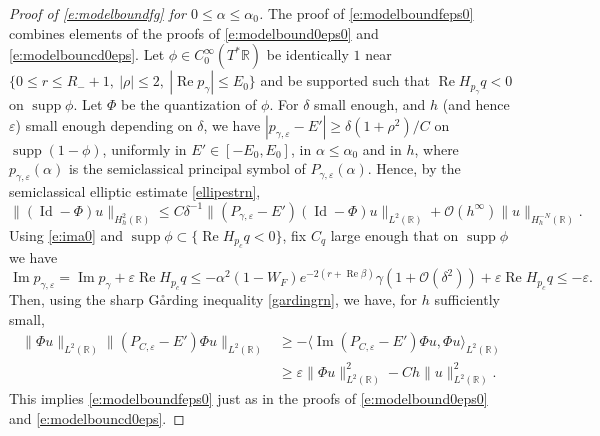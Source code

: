 \documentclass[reqno, 12pt]{amsart}
\newcommand \R {\mathbb{R}}
\newcommand \Oh {\mathcal{O}}
\newcommand \la {\langle}
\newcommand \ra {\rangle}
\newcommand \eps {\varepsilon}
\DeclareMathOperator \re {Re}
\DeclareMathOperator \im {Im}
\DeclareMathOperator \supp {supp}
\DeclareMathOperator \Id {Id}
\theoremstyle{definition}
\numberwithin{equation}{section}
\numberwithin{prop}{section}
\numberwithin{figure}{section}
\begin{document}
\begin{proof}[Proof of \eqref{e:modelboundfg} for $0 \le \alpha \le \alpha_0$]
The proof of \eqref{e:modelboundfeps0} combines  elements of the proofs of \eqref{e:modelbound0eps0} and \eqref{e:modelbouncd0eps}. Let $\phi \in C_0^\infty(T^*\R)$ be identically $1$ near $\{0 \le r \le R_- + 1,\ | \rho|\le2,\ |\re p_\gamma| \le E_0\}$ and be supported such that $\re H_{p_\gamma}q <0$ on $\supp \phi$. Let $\Phi$ be the quantization of $\phi$. For $\delta$ small enough, and $h$ (and hence $\eps$) small enough depending on $\delta$,  we have $|p_{\gamma,\eps} - E'| \ge \delta (1 +  \rho^2)/C$ on $\supp (1-\phi)$, uniformly in $E' \in [-E_0,E_0]$, in $\alpha \le \alpha_0$ and in $h$, where $p_{\gamma,\eps}(\alpha)$ is the semiclassical principal symbol of $P_{\gamma,\eps}(\alpha)$. Hence, by the semiclassical elliptic estimate \eqref{ellipestrn},
\[
\|(\Id - \Phi) u\|_{H^2_{h}(\R)} \le C \delta^{-1}\|(P_{\gamma,\eps} - E')(\Id - \Phi) u\|_{L^2(\R)} + \Oh(h^\infty)\|u\|_{H^{-N}_{ h}(\R)}.
\]
Using \eqref{e:ima0} and $\supp\phi \subset \{\re H_{p_c}q <0\}$, fix $C_q$ large enough that on $\supp\phi$  we have
\[
\im p_{\gamma,\eps} =  \im p_\gamma + \eps \re H_{p_c} q
\le  -\alpha^2(1-W_F)e^{-2(r + \re \beta)} \gamma (1 + \Oh(\delta^2)) + \eps \re H_{p_c} q \le -\eps.
\]
Then, using the sharp G\aa rding inequality \eqref{gardingrn}, we have, for $h$ sufficiently small,
\[\begin{split}
\|\Phi u\|_{L^2(\R)} \|(P_{C,\eps} - E')\Phi u\|_{L^2(\R)}  &\ge - \la\im (P_{C,\eps} - E')\Phi u, \Phi u \ra_{L^2(\R)} \\
& \ge \eps \|\Phi u\|_{L^2(\R)}^2 - C h \|u\|^2_{L^2(\R)} .
\end{split}\]
This implies  \eqref{e:modelboundfeps0}  just as in the proofs of \eqref{e:modelbound0eps0} and \eqref{e:modelbouncd0eps}. 
\end{proof}
\end{document}
